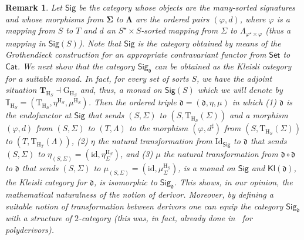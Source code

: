 \documentclass{amsart}
\newcommand{\uadj}{\top}           %
\theoremstyle{plain}
\newtheorem{remark}[theorem]{Remark}
\theoremstyle{definition}
\begin{document}
\begin{remark}
	Let $\mathsf{Sig}$ be the category whose objects are the many-sorted signatures and whose morphisms from $\mathbf{\Sigma}$ to $\mathbf{\Lambda}$ are the ordered pairs $(\varphi,d)$, where $\varphi$ is a mapping from $S$ to $T$ and $d$ an $S^{\star}\times S$-sorted mapping from $\Sigma$ to $\Lambda_{\varphi^{\star}\times \varphi}$ (thus a mapping in $\mathsf{Sig}(S)$). Note that $\mathsf{Sig}$ is the category obtained by means of the Grothendieck construction for an  appropriate contravariant functor from $\mathsf{Set}$ to $\mathsf{Cat}$.
	We next show that the category $\mathsf{Sig}_{\mathfrak{d}}$ can be obtained as the Kleisli category for a suitable monad. In fact, for every  set of sorts $S$, we have the adjoint situation $\mathbf{T}_{\mathrm{H}_{S}}\dashv\mathrm{G}_{\mathrm{H}_{S}}$
	and, thus, a monad on $\mathsf{Sig}(S)$ which we will denote by $\mathbb{T}_{\mathrm{H}_{S}} = (\mathrm{T}_{\mathrm{H}_{S}},\eta^{\mathrm{H}_{S}},\mu^{\mathrm{H}_{S}})$. Then the ordered triple $\boldsymbol{\mathfrak{d}} = (\mathfrak{d},\eta,\mu)$ in which (1) $\mathfrak{d}$ is the endofunctor at $\mathsf{Sig}$ that sends $(S,\Sigma)$ to $(S,\mathrm{T}_{\mathrm{H}_{S}}(\Sigma))$ and a morphism $(\varphi,d)$ from $(S,\Sigma)$ to  $(T,\Lambda)$ to the morphism $(\varphi,d^{\sharp})$ from $(S,\mathrm{T}_{\mathrm{H}_{S}}(\Sigma))$ to  $(T,\mathrm{T}_{\mathrm{H}_{T}}(\Lambda))$, (2) $\eta$ the natural transformation from $\mathrm{Id}_{\mathsf{Sig}}$ to  $\mathfrak{d}$ that sends $(S,\Sigma)$ to $\eta_{(S,\Sigma)} = (\mathrm{id},\eta^{\mathrm{H}_{S}}_{\Sigma})$, and (3) $\mu$ the natural transformation from $\mathfrak{d}\circ \mathfrak{d}$ to $\mathfrak{d}$ that sends $(S,\Sigma)$ to $\mu_{(S,\Sigma)} = (\mathrm{id},\mu^{\mathrm{H}_{S}}_{\Sigma})$, is a monad on $\mathsf{Sig}$ and $\mathsf{Kl}(\boldsymbol{\mathfrak{d}})$, the Kleisli category for $\boldsymbol{\mathfrak{d}}$, is isomorphic to $\mathsf{Sig}_{\mathfrak{d}}$. This shows, in our opinion, the mathematical naturalness of the notion of derivor. Moreover, by defining a suitable notion of transformation between derivors one can equip the category $\mathsf{Sig}_{\mathfrak{d}}$ with a structure of $2$-category (this was, in fact, already done in~\cite{CVST10b} for polyderivors).
	
\end{remark}
\end{document}
